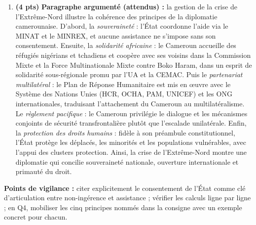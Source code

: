 \documentclass[11pt]{article}
\begin{document}
\begin{corrige}
\begin{enumerate}
    \item \textbf{(4 pts)} \textbf{Paragraphe argumenté (attendus) :} la gestion de la crise de l'Extrême-Nord illustre la cohérence des principes de la diplomatie camerounaise. D'abord, la \emph{souveraineté} : l'État coordonne l'aide via le MINAT et le MINREX, et aucune assistance ne s'impose sans son consentement. Ensuite, la \emph{solidarité africaine} : le Cameroun accueille des réfugiés nigérians et tchadiens et coopère avec ses voisins dans la Commission Mixte et la Force Multinationale Mixte contre Boko Haram, dans un esprit de solidarité sous-régionale promu par l'UA et la CEMAC. Puis le \emph{partenariat multilatéral} : le Plan de Réponse Humanitaire est mis en œuvre avec le Système des Nations Unies (HCR, OCHA, PAM, UNICEF) et les ONG internationales, traduisant l'attachement du Cameroun au multilatéralisme. Le \emph{règlement pacifique} : le Cameroun privilégie le dialogue et les mécanismes conjoints de sécurité transfrontalière plutôt que l'escalade unilatérale. Enfin, la \emph{protection des droits humains} : fidèle à son préambule constitutionnel, l'État protège les déplacés, les minorités et les populations vulnérables, avec l'appui des clusters protection. Ainsi, la crise de l'Extrême-Nord montre une diplomatie qui concilie souveraineté nationale, ouverture internationale et primauté du droit.
\end{enumerate}
\textbf{Points de vigilance :} citer explicitement le consentement de l'État comme clé d'articulation entre non-ingérence et assistance ; vérifier les calculs ligne par ligne ; en Q4, mobiliser les cinq principes nommés dans la consigne avec un exemple concret pour chacun.
\end{corrige}
\end{document}
